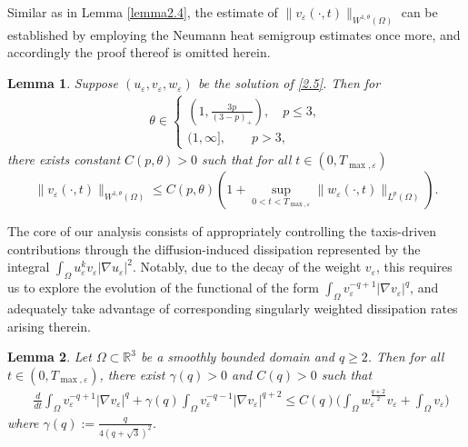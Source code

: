 \documentclass[12pt]{article}
\theoremstyle{plain}
\newtheorem{lemma}{Lemma}[section]
\theoremstyle{definition}
\numberwithin{equation}{section}
\begin{document}
Similar as in Lemma \ref{lemma2.4},  the estimate of $\|v_\varepsilon(\cdot,t)\|_{W^{1,\theta}(\Omega)}$ can be established by employing the Neumann heat semigroup estimates once more, and accordingly the proof thereof is omitted herein.
\begin{lemma}\label{lemma2.6}
Suppose  $(u_\varepsilon,v_\varepsilon,w_\varepsilon)$  be the solution of \eqref{2.5}. Then for %
\begin{equation*}
    \begin{aligned}
        \theta\in\left\{
    \begin{array}{l}
        {\left({1,\frac{3p}{(3-p)_+}}\right)},\quad p\leq 3, \\
         {(1,\infty]},\quad\quad p>3,
    \end{array}\right.
\end{aligned}
\end{equation*}
there exists constant $C(p,\theta)>0$ such that  for all $t\in(0,T_{\max,\varepsilon})$
\begin{equation*}
    \|v_\varepsilon(\cdot,t)\|_{W^{1,\theta}(\Omega)}\leq C(p,\theta)(1+\sup\limits_{0<t<T_{\max,\varepsilon}}\|w_\varepsilon(\cdot,t)\|_{L^p(\Omega)}).
\end{equation*}\end{lemma}
The core of our analysis consists of appropriately controlling the taxis-driven contributions through the diffusion-induced dissipation represented by the integral
$\int_{\Omega} u_\varepsilon^{k} v_\varepsilon |\nabla u_\varepsilon|^2$. Notably, due to the decay of the weight $v_\varepsilon$,
this
 requires us to explore the evolution of the functional of the form  $\int_\Omega v_\varepsilon^{-q+1}|\nabla v_\varepsilon|^q$,
and
  adequately take advantage of corresponding singularly weighted dissipation rates arising therein.
\begin{lemma}\label{lemma2.7}
    Let $\Omega\subset\mathbb{R}^3$ be a smoothly bounded domain and $q\geq2$. Then for all $t\in(0,T_{\max,\varepsilon})$, there exist $\gamma(q)>0$ and $C(q)>0$ such that
    \begin{equation}\label{2.15}
    \begin{split}
        &\frac{d}{dt}\int_{\Omega}v_\varepsilon^{-q+1}|\nabla v_\varepsilon|^q+\gamma(q)\int_{\Omega}v_\varepsilon^{-q-1}|\nabla v_\varepsilon|^{q+2}\leq  C(q)\bigg(\int_{\Omega}w_\varepsilon^{\frac{q+2}{2}}v_\varepsilon+\int_\Omega v_\varepsilon\bigg)
    \end{split}
    \end{equation}
    where $\gamma(q):=\frac{q}{4(q+\sqrt{3})^2}$.
\end{lemma}
\end{document}
